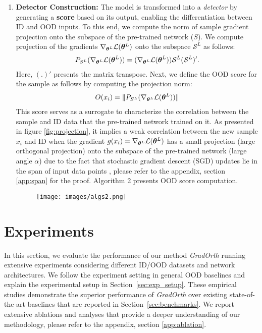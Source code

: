 \documentclass{article}
\newcommand\norm[1]{\lVert#1\rVert}
\begin{document}
\begin{enumerate}
\item\textbf{Detector Construction:} The model is transformed into a \textit{detector} by generating a \textbf{score} based on its output, enabling the differentiation between ID and OOD inputs. To this end, we compute the norm of sample gradient projection onto the subspace of the pre-trained network ($S$). 
We compute projection of the gradients $\nabla_{{\bm{\theta}}^L} \mathcal{L}({\bm{\theta}}^L)$ onto the subspace $\mathcal{S}^L$ as follows: 
\begin{align}
    P_{S^L}(\nabla_{{\bm{\theta}}^L} \mathcal{L}({\bm{\theta}}^L))=(\nabla_{{\bm{\theta}}^L} \mathcal{L}({\bm{\theta}}^L))\mathcal{S}^L(\mathcal{S}^L)'.
    \label{eq:projection}
\end{align}
Here, $(.)'$ presents the matrix transpose. Next, we define the OOD score for the sample as follows by computing the projection norm:
\begin{align}
    O(x_i)= \norm{P_{S^L}(\nabla_{\mtheta^L} \mathcal{L}(\mtheta^L))}
    \label{grad_orthScore}
\end{align}
This score serves as a surrogate to characterize the correlation between the sample and ID data that the pre-trained network trained on it. As presented in figure \ref{fig:projection}, it implies a weak correlation between the new sample $x_i$ and ID when the gradient $g(x_i)=\nabla_{{\bm{\theta}}^L} \mathcal{L}({\bm{\theta}}^L)$ has a small projection (large orthogonal projection) onto the subspace of the pre-trained network (large angle $\alpha$) due to the fact that stochastic gradient descent (SGD) updates lie in the span of input data points \cite{zhu2017learning}, please refer to the appendix, section \ref{app:span} for the proof. 
Algorithm 2 presents OOD score computation.
\begin{figure}[H]
    \centering
    \texttt{[image: images/algs2.png]}
   
    \label{fig:my_label}
\end{figure}
\end{enumerate}

\section{Experiments}\vspace{-0.2cm}
In this section, we evaluate the performance of our method \textit{GradOrth} running extensive experiments considering different ID/OOD datasets and network architectures. We follow the experiment setting in general OOD baselines and explain the experimental setup in Section~\ref{sec:exp_setup}. These empirical studies demonstrate the superior performance of \textit{GradOrth} over existing state-of-the-art baselines that are reported in Section~\ref{sec:benchmarks}. We report extensive ablations and analyses that provide a deeper understanding of our methodology, please refer to the appendix, section \ref{app:ablation}.
\end{document}
